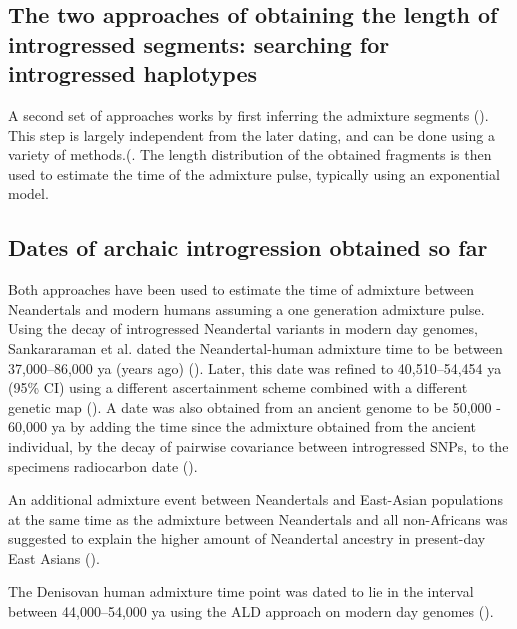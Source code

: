 \documentclass[]{article}
\begin{document}
\subsection{The two approaches of obtaining the length of introgressed
segments: searching for introgressed
haplotypes}\label{the-two-approaches-of-obtaining-the-length-of-introgressed-segments-searching-for-introgressed-haplotypes}

A second set of approaches works by first inferring the admixture segments
(\cite{gravel_population_2012,price_sensitive_2009}). This step is largely independent from the later dating, and can be done using a variety of methods.(\cite{racimo_signatures_2017,seguin_orlando_paleogenomics_2014,vernot_excavating_2016,sankararaman_combined_2016,skov_detecting_2018}. The length distribution of the obtained fragments is then used to estimate the time of the admixture pulse, typically using an exponential model.

\subsection{Dates of archaic introgression obtained so
far}\label{dates-of-archaic-introgression-obtained-so-far}

Both approaches have been used to estimate the time of admixture between
Neandertals and modern humans assuming a one generation admixture pulse.
Using the decay of introgressed Neandertal variants in modern day
genomes, Sankararaman et al. dated the Neandertal-human admixture time to
be  between 37,000--86,000 ya (years ago) (\cite{sankararaman_date_2012}). Later,
this date was refined to 40,510--54,454 ya (95\% CI) using a different
ascertainment scheme combined with a different genetic map
(\cite{moorjani_genetic_2016}). A date was also obtained from an ancient
genome to be 50,000 - 60,000 ya by adding the time since the admixture obtained from the
ancient individual, by the decay of pairwise covariance between
introgressed SNPs, to the specimens radiocarbon date
(\cite{fu_genome_2014}).

An additional admixture event between Neandertals and East-Asian
populations at the same time as the admixture between Neandertals and
all non-Africans was suggested to explain the higher amount of
Neandertal ancestry in present-day East Asians
(\cite{kim_selection_2015,vernot_complex_2015}). 

The Denisovan human
admixture time point was dated to lie in the interval between 44,000--54,000 ya using the ALD
approach on modern day genomes (\cite{sankararaman_combined_2016}).
\end{document}
